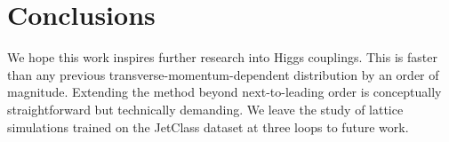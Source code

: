 \section{Conclusions}\label{sec:conclusions}

We hope this work inspires further research into Higgs couplings. This
is faster than any previous transverse-momentum-dependent distribution
by an order of magnitude. Extending the method beyond next-to-leading
order is conceptually straightforward but technically demanding. We
leave the study of lattice simulations trained on the JetClass dataset
at three loops to future work.

